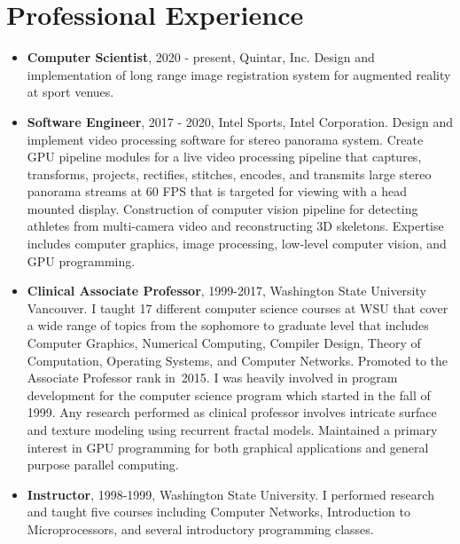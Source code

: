 \documentclass[10pt]{article}
\begin{document}
\section*{Professional Experience}

\begin{itemize}
\item {\bf Computer Scientist}, 2020 - present, Quintar, Inc. 
Design and implementation of long range image registration system
for augmented reality at sport venues.

\item {\bf Software Engineer}, 2017 - 2020,
Intel Sports, Intel Corporation. Design
and implement video processing software for 
stereo panorama system. Create
GPU pipeline modules for a live video processing
pipeline that captures, transforms, projects,
rectifies, stitches, encodes, and transmits
large stereo panorama streams at 60 FPS that is
targeted for viewing
with a head mounted display. 
Construction of computer vision pipeline for detecting
athletes from multi-camera video and reconstructing 3D skeletons.
Expertise
includes computer graphics, image processing,
low-level computer vision, and GPU programming.


\item {\bf Clinical Associate Professor}, 1999-2017,
Washington State University Vancouver.
I taught 17 different computer science courses at WSU that cover a wide
range of topics from the sophomore to graduate level that includes
Computer Graphics, Numerical Computing, Compiler Design, Theory of Computation,
Operating Systems, and Computer Networks.
Promoted
to the Associate Professor rank in~2015.
I was heavily involved in program development for 
the computer science program which started in the fall of 1999.
Any research performed as clinical professor involves intricate surface and texture
modeling using recurrent fractal models. %
Maintained a primary interest in GPU programming for both
graphical applications and general purpose parallel computing.

\item {\bf Instructor}, 1998-1999,
Washington State University. I performed research and taught five
courses including Computer Networks, Introduction to Microprocessors,
and several introductory programming classes.





\end{itemize}
\end{document}
